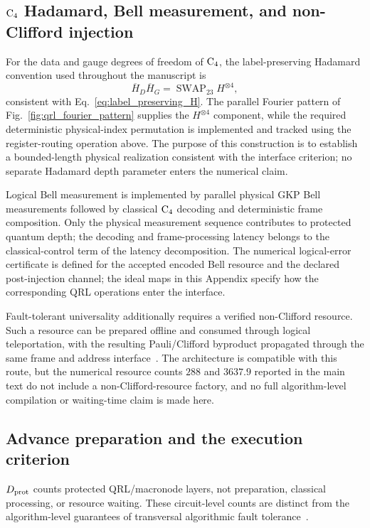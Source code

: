 \documentclass[aps,
prx,
superscriptaddress,
reprint,
longbibliography,
floatfix]{revtex4-2}
\newcounter{criterion}[section]
\begin{document}
\subsection{${\rm C_4}$ Hadamard, Bell measurement, and non-Clifford injection}
For the data and gauge degrees of freedom of ${\rm C_4}$, the label-preserving Hadamard convention used throughout the manuscript is
\begin{equation}
\overline H_D\overline H_G
=
\operatorname{SWAP}_{23}H^{\otimes4},
\end{equation}
consistent with Eq.~\eqref{eq:label_preserving_H}. The parallel Fourier pattern of Fig.~\ref{fig:qrl_fourier_pattern} supplies the $H^{\otimes4}$ component, while the required deterministic physical-index permutation is implemented and tracked using the register-routing operation above. The purpose of this construction is to establish a bounded-length physical realization consistent with the interface criterion; no separate Hadamard depth parameter enters the numerical claim.

Logical Bell measurement is implemented by parallel physical GKP Bell measurements followed by classical ${\rm C_4}$ decoding and deterministic frame composition. Only the physical measurement sequence contributes to protected quantum depth; the decoding and frame-processing latency belongs to the classical-control term of the latency decomposition. The numerical logical-error certificate is defined for the accepted encoded Bell resource and the declared post-injection channel; the ideal maps in this Appendix specify how the corresponding QRL operations enter the interface.

Fault-tolerant universality additionally requires a verified non-Clifford resource. Such a resource can be prepared offline and consumed through logical teleportation, with the resulting Pauli/Clifford byproduct propagated through the same frame and address interface~\cite{BravyiKitaev2005Magic,BravyiHaah2012Magic}. The architecture is compatible with this route, but the numerical resource counts $288$ and $3637.9$ reported in the main text do not include a non-Clifford-resource factory, and no full algorithm-level compilation or waiting-time claim is made here.
\subsection{Advance preparation and the execution criterion}\label{app:execution_criterion}
$D_{\rm prot}$ counts protected QRL/macronode layers, not preparation, classical processing, or resource waiting. These circuit-level counts are distinct from the algorithm-level guarantees of transversal algorithmic fault tolerance~\cite{Zhou2025TransversalAFT}.
\end{document}
